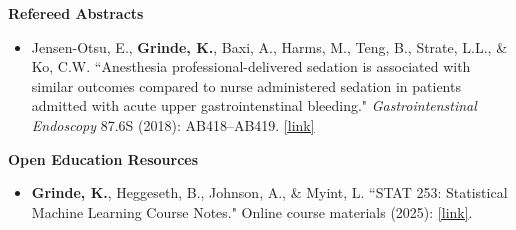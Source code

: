 \documentclass[margin]{res}
\newcommand{\annotateItem}[1]{
	\begin{itemize} \vspace{-0.1cm}
	\item[] 
	\begin{footnotesize}\textcolor{black}{(#1)}\end{footnotesize}
	\end{itemize} \vspace{-0.1cm}
}
\begin{document}
\begin{resume}
	
\textbf{Refereed Abstracts}
\begin{itemize}
\item[1.] Jensen-Otsu, E., \textbf{Grinde, K.}, Baxi, A., Harms, M., Teng, B., Strate, L.L., \& Ko, C.W. 
``Anesthesia professional-delivered sedation is associated with similar outcomes compared to nurse administered sedation in patients admitted with acute upper gastrointenstinal bleeding." \textit{Gastrointenstinal Endoscopy} 87.6S (2018):  AB418--AB419. %
\href{https://www.giejournal.org/article/S0016-5107(18)32182-5/fulltext}{[link]}

\end{itemize}



\textbf{Open Education Resources}

\begin{itemize}
\item[3.] \textbf{Grinde, K.}, Heggeseth, B., Johnson, A., \& Myint, L. ``STAT 253: Statistical Machine Learning Course Notes." 
Online course materials (2025): \href{https://kegrinde.github.io/STAT253/}{[link]}. 


\end{itemize}
\end{resume}
\end{document}
